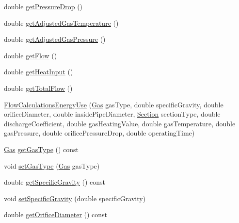 \begin{DoxyCompactItemize}
\item 
double \hyperlink{class_flow_calculations_energy_use_a35aa80b2b9ea8769d56bf9e8d5837927}{get\+Pressure\+Drop} ()
\item 
double \hyperlink{class_flow_calculations_energy_use_a6efdcd6364e01577dda38dc49601df53}{get\+Adjusted\+Gas\+Temperature} ()
\item 
double \hyperlink{class_flow_calculations_energy_use_a8633821730568a5b1449914060c52aad}{get\+Adjusted\+Gas\+Pressure} ()
\item 
double \hyperlink{class_flow_calculations_energy_use_a6b892e984bd09e821cb642f8f8efd221}{get\+Flow} ()
\item 
double \hyperlink{class_flow_calculations_energy_use_af2d2196911d4784d72b14dff83295b19}{get\+Heat\+Input} ()
\item 
double \hyperlink{class_flow_calculations_energy_use_a154ce8f8307b443366b99719987dd725}{get\+Total\+Flow} ()
\item 
\hyperlink{class_flow_calculations_energy_use_a37514554d3cb04764b27d648966de471}{Flow\+Calculations\+Energy\+Use} (\hyperlink{class_flow_calculations_energy_use_a840d5a836e7b05d6791b79bace4440f2}{Gas} gas\+Type, double specific\+Gravity, double orifice\+Diameter, double inside\+Pipe\+Diameter, \hyperlink{class_flow_calculations_energy_use_afbabab0da698748de91369a5dfc7662a}{Section} section\+Type, double discharge\+Coefficient, double gas\+Heating\+Value, double gas\+Temperature, double gas\+Pressure, double orifice\+Pressure\+Drop, double operating\+Time)
\item 
\hyperlink{class_flow_calculations_energy_use_a840d5a836e7b05d6791b79bace4440f2}{Gas} \hyperlink{class_flow_calculations_energy_use_a04df0a0c655c4aef3d5a4539d57fec2e}{get\+Gas\+Type} () const
\item 
void \hyperlink{class_flow_calculations_energy_use_a01b38762426c50e6ab22aefd674f30df}{set\+Gas\+Type} (\hyperlink{class_flow_calculations_energy_use_a840d5a836e7b05d6791b79bace4440f2}{Gas} gas\+Type)
\item 
double \hyperlink{class_flow_calculations_energy_use_adc3ac2406e00a75c33be0a6a66153da3}{get\+Specific\+Gravity} () const
\item 
void \hyperlink{class_flow_calculations_energy_use_abafa34d337124a1487fb0c871ea8a24a}{set\+Specific\+Gravity} (double specific\+Gravity)
\item 
double \hyperlink{class_flow_calculations_energy_use_a71c34f09ec3524db321b8934930700c5}{get\+Orifice\+Diameter} () const
\item 

\end{DoxyCompactItemize}
